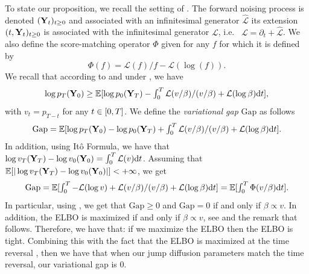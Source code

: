 To state our proposition, we recall the setting of
\citet{benton2022denoising}. The forward noising process is denoted
$(\mathbf{Y}_t)_{t \geq 0}$ and associated with an infinitesimal generator
$\hat{\mathcal{L}}$ its extension $(t, \mathbf{Y}_t)_{t \geq 0}$ is associated with
the infinitesimal generator $\mathcal{L}$, i.e.~
$\mathcal{L} = \partial_t + \hat{\mathcal{L}}$. We also define the
score-matching operator $\Phi$ given for any $f$ for which it is defined by
\begin{equation}
  \Phi(f) = \mathcal{L}(f)/f - \mathcal{L}(\log(f)) . 
\end{equation}
We recall that according to \cite[Equation (8)]{benton2022denoising} and under
\cite[Assumption 1, Assumption2]{benton2022denoising}, we have
\begin{equation}
 \textstyle \log p_T(\mathbf{Y}_0) \geq \mathbb{E}[\log p_0(\mathbf{Y}_T) - \int_0^T \mathcal{L}(v/\beta)/(v/\beta) + \mathcal{L}(\log \beta) \mathrm{d} t] ,
\end{equation}
with $v_t = p_{T-t}$ for any $t \in [ 0,T ]$. 
We define the \emph{variational gap} $\mathrm{Gap}$ as follows
\begin{equation}
  \mathrm{Gap} = \mathbb{E}[\textstyle \log p_T(\mathbf{Y}_0) - \log p_0(\mathbf{Y}_T) + \int_0^T \mathcal{L}(v/\beta)/(v/\beta) + \mathcal{L}(\log \beta) \mathrm{d} t] .
\end{equation}
In addition, using It\^o Formula, we have that $\log v_T(\mathbf{Y}_T) - \log v_0(\mathbf{Y}_0) = \int_0^T \mathcal{L}(v) \mathrm{d} t$.
Assuming that $\mathbb{E}[|\log v_T(\mathbf{Y}_T) - \log v_0(\mathbf{Y}_0)|] < +\infty$, we get
\begin{equation}
  \textstyle \mathrm{Gap} = \mathbb{E}[\int_0^T -\mathcal{L}(\log v) + \mathcal{L}(v/\beta)/(v/\beta) + \mathcal{L}(\log \beta) \mathrm{d} t] = \mathbb{E}[\int_0^T \Phi(v/\beta) \mathrm{d} t] . 
\end{equation}
In particular, using \cite[Proposition 1]{benton2022denoising}, we get that
$\mathrm{Gap} \geq 0$ and $\mathrm{Gap} = 0$ if and only if $\beta \propto
v$. In addition, the ELBO is maximized if and only if $\beta \propto v$, see
\cite[Equation 10]{benton2022denoising} and the remark that follows. Therefore,
we have that: if we maximize the ELBO then the ELBO is tight. Combining this with the fact that the ELBO is maximized at the time reversal \citet{benton2022denoising}, then we have that when our jump diffusion parameters match the time reversal, our variational gap is $0$.















